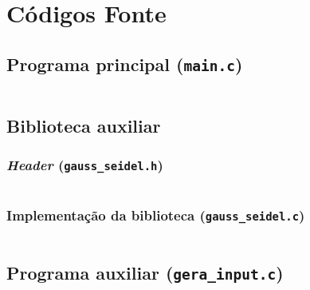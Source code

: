 \section{Códigos Fonte}

	\subsection{Programa principal (\texttt{main.c})}
		\inputminted[autogobble,breaklines,linenos,frame=lines,tabsize=4,obeytabs=true,fontsize=\footnotesize
		]{c}{source_codes/main.c}
		\label{lst:main.c}

	\subsection{Biblioteca auxiliar}
		\subsubsection{\emph{Header} (\texttt{gauss\_seidel.h})}
			\inputminted[autogobble,breaklines,linenos,frame=lines,tabsize=4,obeytabs=true,fontsize=\footnotesize
			]{c}{source_codes/gauss_seidel.h}
			\label{lst:gauss_seidel.h}

		\subsubsection{Implementação da biblioteca (\texttt{gauss\_seidel.c})}
			\inputminted[autogobble,breaklines,linenos,frame=lines,tabsize=4,obeytabs=true,fontsize=\footnotesize
			]{c}{source_codes/gauss_seidel.c}
			\label{lst:gauss_seidel.c}

	\subsection{Programa auxiliar (\texttt{gera\_input.c})}
		\inputminted[autogobble,breaklines,linenos,frame=lines,tabsize=4,obeytabs=true,fontsize=\footnotesize
			]{c}{source_codes/gera_input.c}
			\label{lst:gera_input.c}